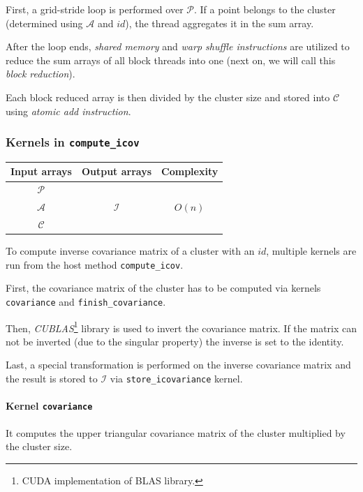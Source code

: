 First, a grid-stride loop is performed over $\mathcal{P}$. If a point belongs to the cluster (determined using $\mathcal{A}$ and $id$), the thread aggregates it in the sum array. 

After the loop ends, \emph{shared memory} and \emph{warp shuffle instructions} are utilized to reduce the sum arrays of all block threads into one (next on, we will call this \emph{block reduction}).

Each block reduced array is then divided by the cluster size and stored into $\mathcal{C}$ using \emph{atomic add instruction}. 

\subsubsection{Kernels in \texttt{compute\_icov}}

\begin{table}[h]
	\centering
	\begin{tabular}{ccc}
		\toprule
		\textbf{Input arrays} & \textbf{Output arrays} & \textbf{Complexity} \\ \midrule
		    $\mathcal{P}$     &                        &                     \\
		    $\mathcal{A}$     &     $\mathcal{I}$      &       $O(n)$        \\
		    $\mathcal{C}$     &                        &                     \\ \bottomrule
	\end{tabular}
\end{table}

To compute inverse covariance matrix of a cluster with an $id$, multiple kernels are run from the host method \texttt{compute\_icov}. 

First, the covariance matrix of the cluster has to be computed via kernels \texttt{covariance} and \texttt{finish\_covariance}. 

Then, \emph{CUBLAS}\footnote{CUDA implementation of BLAS library.} library is used to invert the covariance matrix. If the matrix can not be inverted (due to the singular property) the inverse is set to the identity. 

Last, a special transformation is performed on the inverse covariance matrix and the result is stored to $\mathcal{I}$ via \texttt{store\_icovariance} kernel.

\paragraph{Kernel \texttt{covariance}}
It computes the upper triangular covariance matrix of the cluster multiplied by the cluster size. 

